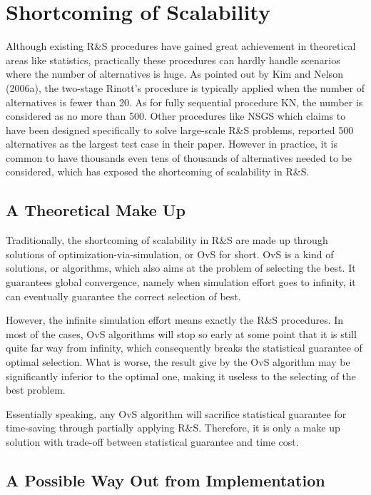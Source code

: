 \documentclass[12pt,a4]{report}
\begin{document}
\section{Shortcoming of Scalability}

Although existing R\&S procedures have gained great achievement in theoretical areas like statistics, practically these procedures can hardly handle scenarios where the number of alternatives is huge. As pointed out by Kim and Nelson (2006a), the two-stage Rinott’s procedure is typically applied when the number of alternatives is fewer than 20. As for fully sequential procedure KN, the number is considered as no more than 500. Other procedures like NSGS which claims to have been designed specifically to solve large-scale R\&S problems, reported 500 alternatives as the largest test case in their paper. However in practice, it is common to have thousands even tens of thousands of alternatives needed to be considered, which has exposed the shortcoming of scalability in R\&S.

\subsection{A Theoretical Make Up}

Traditionally, the shortcoming of scalability in R\&S are made up through solutions of optimization-via-simulation, or OvS for short. OvS is a kind of solutions, or algorithms, which also aims at the problem of selecting the best. It guarantees global convergence, namely when simulation effort goes to infinity, it can eventually guarantee the correct selection of best.

However, the infinite simulation effort means exactly the R\&S procedures. In most of the cases, OvS algorithms will stop so early at some point that it is still quite far way from infinity, which consequently breaks the statistical guarantee of optimal selection. What is worse, the result give by the OvS algorithm may be significantly inferior to the optimal one, making it useless to the selecting of the best problem. 

Essentially speaking, any OvS algorithm will sacrifice statistical guarantee for time-saving through partially applying R\&S. Therefore, it is only a make up solution with trade-off between statistical guarantee and time cost.

\subsection{A Possible Way Out from Implementation}
\end{document}
